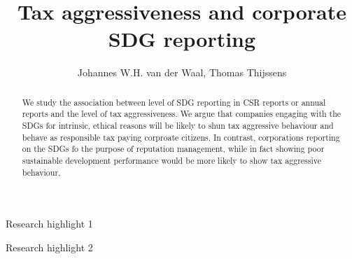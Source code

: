 \documentclass[preprint,12pt,authoryear]{elsarticle}
\begin{document}
\begin{frontmatter}



\title{Tax aggressiveness and corporate SDG reporting}

\author[label1]{Johannes W.H. van der Waal, Thomas Thijssens}

\begin{abstract}
We study the association between level of SDG reporting in CSR reports or annual reports and the level of tax aggressiveness. We argue that companies engaging with the SDGs for intrinsic, ethical reasons will be likely to shun tax aggressive behaviour and behave as responsible tax paying corproate citizens. In contrast, corporations reporting on the SDGs fo the purpose of reputation management, while in fact showing poor sustainable development performance would be more likely to show tax aggressive behaviour.

\end{abstract}

\begin{graphicalabstract}
\end{graphicalabstract}

\begin{highlights}
\item Research highlight 1
\item Research highlight 2
\end{highlights}


\end{frontmatter}
\end{document}

